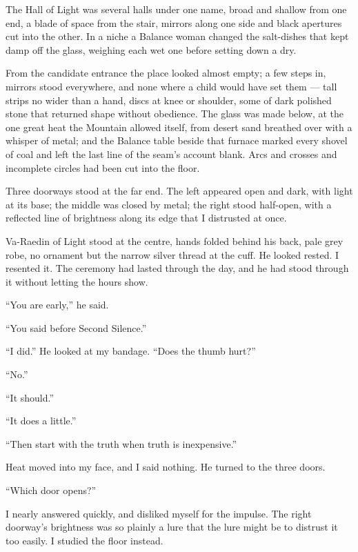 The Hall of Light was several halls under one name, broad and shallow from one end, a blade of space from the stair, mirrors along one side and black apertures cut into the other. In a niche a Balance woman changed the salt-dishes that kept damp off the glass, weighing each wet one before setting down a dry.\par

From the candidate entrance the place looked almost empty; a few steps in, mirrors stood everywhere, and none where a child would have set them --- tall strips no wider than a hand, discs at knee or shoulder, some of dark polished stone that returned shape without obedience. The glass was made below, at the one great heat the Mountain allowed itself, from desert sand breathed over with a whisper of metal; and the Balance table beside that furnace marked every shovel of coal and left the last line of the seam's account blank. Arcs and crosses and incomplete circles had been cut into the floor.\par
Three doorways stood at the far end. The left appeared open and dark, with light at its base; the middle was closed by metal; the right stood half-open, with a reflected line of brightness along its edge that I distrusted at once.\par

Va-Raedin of Light stood at the centre, hands folded behind his back, pale grey robe, no ornament but the narrow silver thread at the cuff. He looked rested. I resented it.
The ceremony had lasted through the day, and he had stood through it without letting the hours show.\par

``You are early,'' he said.\par
``You said before Second Silence.''\par
``I did.'' He looked at my bandage. ``Does the thumb hurt?''\par
``No.''\par
``It should.''\par
``It does a little.''\par
``Then start with the truth when truth is inexpensive.''\par

Heat moved into my face, and I said nothing. He turned to the three doors. \par

``Which door opens?''\par

I nearly answered quickly, and disliked myself for the impulse. The right doorway's brightness was so plainly a lure that the lure might be to distrust it too easily.
I studied the floor instead.\par

